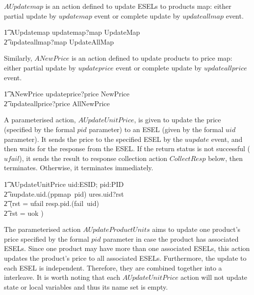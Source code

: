 $AUpdatemap$ is an action defined to update ESELs to products map: either partial update by $updatemap$ event or complete update by $updateallmap$ event.
\begin{circusaction}
        \t1 AUpdatemap \circdef updatemap?map \then \lschexpract UpdateMap \rschexpract \\
            \t2 \extchoice updateallmap?map \then \lschexpract UpdateAllMap \rschexpract \\
\end{circusaction}
Similarly, $ANewPrice$ is an action defined to update products to price map: either partial update by $updateprice$ event or complete update by $updateallprice$ event.
\begin{circusaction}
        \t1 ANewPrice \circdef updateprice?price \then \lschexpract NewPrice \rschexpract \\
            \t2 \extchoice updateallprice?price \then \lschexpract AllNewPrice \rschexpract \\
\end{circusaction}
A parameterised action, $AUpdateUnitPrice$, is given to update the price (specified by the formal $pid$ parameter) to an ESEL (given by the formal $uid$ parameter). It sends the price to the specified ESEL by the $uupdate$ event, and then waits for the response from the ESEL. If the return status is not successful ($ufail$), it sends the result to response collection action $CollectResp$ below, then terminates. Otherwise, it terminates immediately.
\begin{circusaction}
        \t1 AUpdateUnitPrice \circdef uid:ESID; pid:PID \circspot \\
            \t2 uupdate.uid.(ppmap~pid) \then ures.uid?rst \then \\
            \t2 (\lcircguard rst = ufail \rcircguard \circguard resp.pid.(fail~uid) \then \Skip \\
            \t2 \extchoice \lcircguard rst = uok \rcircguard \circguard \Skip)\\
\end{circusaction}
The parameterised action $AUpdateProductUnits$ aims to update one product's price specified by the formal $pid$ parameter in case the product has associated ESELs. Since one product may have more than one associated ESELs, this action updates the product's price to all associated ESELs. Furthermore, the update to each ESEL is independent. Therefore, they are combined together into a interleave. It is worth noting that each $AUpdateUnitPrice$ action will not update state or local variables and thus its name set is empty. 
